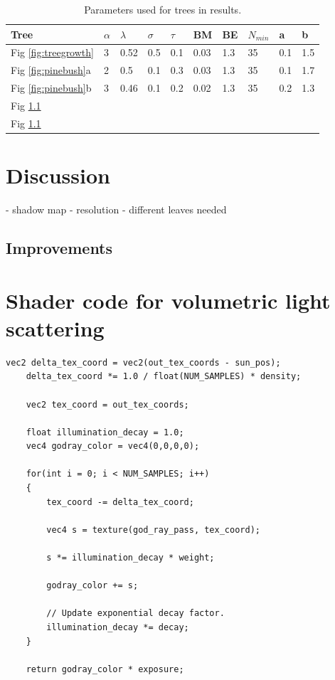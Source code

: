 \documentclass{article}
\begin{document}
  		\begin{table} [!h]
  			\begin{center}
  				\caption{Parameters used for trees in results.}
  				\begin{tabular}{  m{1cm} | P{0.5cm} P{0.5cm} P{0.5cm} P{0.5cm} P{0.5cm} P{0.5cm} P{0.5cm} P{0.5cm} P{0.5cm} } 
  					\hline
  					Tree & $\alpha$ & $\lambda$ & $\sigma$ & $\tau$ & BM & BE & $N_{min}$ & a & b \\
  					\hline
  					Fig \ref{fig:treegrowth} & 3 & 0.52 & 0.5 & 0.1 & 0.03 & 1.3 & 35 & 0.1 & 1.5 \\ 
  					Fig \ref{fig:pinebush}a & 2 & 0.5 & 0.1 & 0.3 & 0.03 & 1.3 & 35 & 0.1 & 1.7 \\ 
  					Fig \ref{fig:pinebush}b & 3 & 0.46 & 0.1 &  0.2 & 0.02 & 1.3 & 35 & 0.2 & 1.3\\ 
  					Fig \ref{} & & & & & & \\ 
  					Fig \ref{} & & & & & & \\ 
  					\hline
  				\end{tabular}
  				\label{table:usedparam}
  			\end{center}
  		\end{table}
  		
  	\section{Discussion}
  		
  		
  		- shadow map - resolution
  		- different leaves needed
  		
  		\subsection{Improvements}

	\newpage
	
	{}
	
	\newpage
	\appendix
	\section{Shader code for volumetric light scattering}
	\label{appendix:godray}
		
	\begin{lstlisting}[basicstyle=\ttfamily\footnotesize, tabsize=4]
	vec2 delta_tex_coord = vec2(out_tex_coords - sun_pos);
	delta_tex_coord *= 1.0 / float(NUM_SAMPLES) * density;
	
	vec2 tex_coord = out_tex_coords;
	
	float illumination_decay = 1.0;
	vec4 godray_color = vec4(0,0,0,0);
	
	for(int i = 0; i < NUM_SAMPLES; i++)
	{
		tex_coord -= delta_tex_coord;
		
		vec4 s = texture(god_ray_pass, tex_coord);
		
		s *= illumination_decay * weight;
		
		godray_color += s;
		
		// Update exponential decay factor.
		illumination_decay *= decay;
	}
	
	return godray_color * exposure;
	\end{lstlisting}
		
\end{document}
